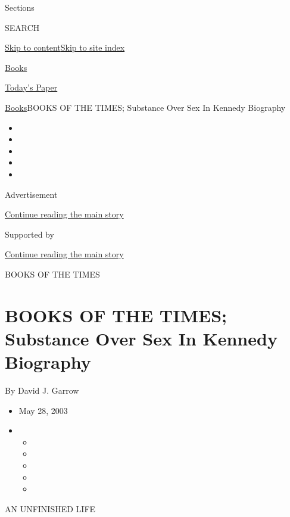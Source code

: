 Sections

SEARCH

\protect\hyperlink{site-content}{Skip to
content}\protect\hyperlink{site-index}{Skip to site index}

\href{https://www.nytimes3xbfgragh.onion/section/books}{Books}

\href{https://myaccount.nytimes3xbfgragh.onion/auth/login?response_type=cookie\&client_id=vi}{}

\href{https://www.nytimes3xbfgragh.onion/section/todayspaper}{Today's
Paper}

\href{/section/books}{Books}\textbar{}BOOKS OF THE TIMES; Substance Over
Sex In Kennedy Biography

\begin{itemize}
\item
\item
\item
\item
\item
\end{itemize}

Advertisement

\protect\hyperlink{after-top}{Continue reading the main story}

Supported by

\protect\hyperlink{after-sponsor}{Continue reading the main story}

BOOKS OF THE TIMES

\hypertarget{books-of-the-times-substance-over-sex-in-kennedy-biography}{%
\section{BOOKS OF THE TIMES; Substance Over Sex In Kennedy
Biography}\label{books-of-the-times-substance-over-sex-in-kennedy-biography}}

By David J. Garrow

\begin{itemize}
\item
  May 28, 2003
\item
  \begin{itemize}
  \item
  \item
  \item
  \item
  \item
  \end{itemize}
\end{itemize}

AN UNFINISHED LIFE

